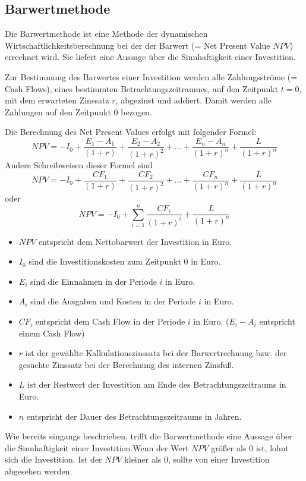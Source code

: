 \documentclass[a4paper,12pt]{article}
\begin{document}
	\subsection{Barwertmethode}
	Die Barwertmethode ist eine Methode der dynamischen Wirtschaftlichkeitsberechnung bei der der Barwert (= Net Present Value $NPV$) errechnet wird. Sie liefert eine Aussage über die Sinnhaftigkeit einer Investition.\\ \par
	\noindent Zur Bestimmung des Barwertes einer Investition werden alle Zahlungsströme (= Cash Flows), eines bestimmten Betrachtungszeitraumes, auf den Zeitpunkt $t=0$, mit dem erwarteten Zinssatz $r$, abgezinst und addiert. Damit werden alle Zahlungen auf den Zeitpunkt $0$ bezogen.\\ \par
	\noindent Die Berechnung des Net Present Values erfolgt mit folgender Formel:
	\begin{equation}
	NPV=-I_0+\frac{E_1-A_1}{(1+r)}+\frac{E_2-A_2}{(1+r)^2}+...+\frac{E_n-A_n}{(1+r)^n}+\frac{L}{(1+r)^n}
	\end{equation}
	Andere Schreibweisen dieser Formel sind
	\begin{equation}
	NPV=-I_0+\frac{CF_1}{(1+r)}+\frac{CF_2}{(1+r)^2}+...+\frac{CF_n}{(1+r)^n}+\frac{L}{(1+r)^n}
	\end{equation}
	oder
	\begin{equation}
	NPV=-I_0+\sum_{i=1}^n\frac{CF_i}{(1+r)^i}+\frac{L}{(1+r)^n}
	\end{equation}
	\begin{itemize}
		\item $NPV$ entspricht dem Nettobarwert der Investition in Euro.
		\item $I_0$ sind die Investitionskosten zum Zeitpunkt $0$ in Euro.
		\item $E_i$ sind die Einnahmen in der Periode $i$ in Euro.
		\item $A_i$ sind die Ausgaben und Kosten in der Periode $i$ in Euro.
		\item $CF_i$ entspricht dem Cash Flow in der Periode $i$ in Euro. ($E_i-A_i$ entspricht einem Cash Flow)
		\item $r$ ist der gewählte Kalkulationszinssatz bei der Barwertrechnung bzw. der gesuchte Zinssatz bei der Berechnung des internen Zinsfuß.
		\item $L$ ist der Restwert der Investition am Ende des Betrachtungszeitraums in Euro.
		\item $n$ entspricht der Dauer des Betrachtungszeitraums in Jahren.
	\end{itemize}
	Wie bereits eingangs beschrieben, trifft die Barwertmethode eine Aussage über die Sinnhaftigkeit einer Investition.\newline Wenn der Wert $NPV$ größer als $0$ ist, lohnt sich die Investition. Ist der $NPV$ kleiner als $0$, sollte von einer Investition abgesehen werden.
	\newpage
\end{document}
